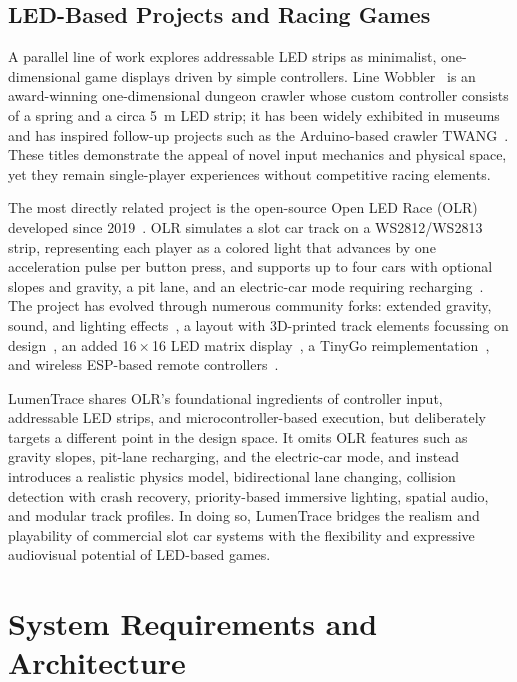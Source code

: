 \documentclass[10pt,journal,final,a4paper]{IEEEtran}
\begin{document}
\subsection{LED-Based Projects and Racing Games}
\label{subsec:led-based-projects-and-racing-games}

A parallel line of work explores addressable LED strips as minimalist, one-dimensional game displays driven by simple controllers. Line Wobbler~\cite{baumgarten:2023line} is an award-winning one-dimensional dungeon crawler whose custom controller consists of a spring and a circa \SI{5}{\meter} LED strip; it has been widely exhibited in museums and has inspired follow-up projects such as the Arduino-based crawler TWANG~\cite{critters:2020twang}. These titles demonstrate the appeal of novel input mechanics and physical space, yet they remain single-player experiences without competitive racing elements. 

The most directly related project is the open-source Open LED Race (OLR) developed since 2019~\cite{pereira:2023applying}. OLR simulates a slot car track on a WS2812/WS2813 strip, representing each player as a colored light that advances by one acceleration pulse per button press, and supports up to four cars with optional slopes and gravity, a pit lane, and an electric-car mode requiring recharging~\cite{openledrace:2023article,openledrace:2025project}. The project has evolved through numerous community forks: extended gravity, sound, and lighting effects~\cite{arminjo:2025open}, a layout with 3D-printed track elements focussing on design~\cite{hackerspace:2024open}, an added 16\,$\times$\,16 LED matrix display~\cite{framboise:2024open}, a TinyGo reimplementation~\cite{esteban:2019ledrace}, and wireless ESP-based remote controllers~\cite{gmag11:2020ledrace}.

LumenTrace shares OLR's foundational ingredients of controller input, addressable LED strips, and microcontroller-based execution, but deliberately targets a different point in the design space. It omits OLR features such as gravity slopes, pit-lane recharging, and the electric-car mode, and instead introduces a realistic physics model, bidirectional lane changing, collision detection with crash recovery, priority-based immersive lighting, spatial audio, and modular track profiles. In doing so, LumenTrace bridges the realism and playability of commercial slot car systems with the flexibility and expressive audiovisual potential of LED-based games.

\section{System Requirements and Architecture}
\label{sec:system-requirements-and-architecture}
\end{document}
